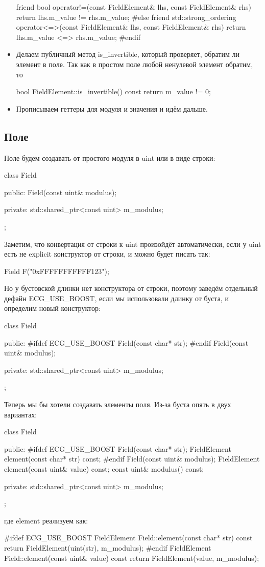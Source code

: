 \begin{itemize}
\begin{cppcode}
friend bool operator!=(const FieldElement& lhs, const FieldElement& rhs) {
    return lhs.m_value != rhs.m_value;
}
#else
friend std::strong_ordering operator<=>(const FieldElement& lhs, const FieldElement& rhs) {
    return lhs.m_value <=> rhs.m_value;
}
#endif
  \end{cppcode}

  \item Делаем публичный метод is\_invertible, который проверяет, обратим ли элемент в поле. Так как в простом поле любой ненулевой элемент обратим, то
  \begin{cppcode}
bool FieldElement::is_invertible() const {
    return m_value != 0;
}
  \end{cppcode}

  \item Прописываем геттеры для модуля и значения и идём дальше.
\end{itemize}
\subsection{Поле}
  Поле будем создавать от простого модуля в uint или в виде строки:
  \begin{cppcode}
class Field {
public:
    Field(const uint& modulus);

private:
    std::shared_ptr<const uint> m_modulus;
};
  \end{cppcode}
  Заметим, что конвертация от строки к uint произойдёт автоматически, если у uint есть не explicit конструктор от строки, и можно будет писать так:
  \begin{cppcode}
Field F("0xFFFFFFFFFFF123");
  \end{cppcode}
  Но у бустовской длинки нет конструктора от строки, поэтому заведём отдельный дефайн ECG\_USE\_BOOST, если мы использовали длинку от буста, и определим новый конструктор:
  \begin{cppcode}
class Field {
public:
#ifdef ECG_USE_BOOST
    Field(const char* str);
#endif
    Field(const uint& modulus);

private:
    std::shared_ptr<const uint> m_modulus;
};
\end{cppcode}
  Теперь мы бы хотели создавать элементы поля. Из-за буста опять в двух вариантах:
  \begin{cppcode}
class Field {
public:
#ifdef ECG_USE_BOOST
    Field(const char* str);
    FieldElement element(const char* str) const;
#endif
    Field(const uint& modulus);
    FieldElement element(const uint& value) const;
    const uint& modulus() const;

private:
    std::shared_ptr<const uint> m_modulus;
};
  \end{cppcode}
  где element реализуем как:
  \begin{cppcode}
#ifdef ECG_USE_BOOST
FieldElement Field::element(const char* str) const {
    return FieldElement(uint(str), m_modulus);
}
#endif
FieldElement Field::element(const uint& value) const {
    return FieldElement(value, m_modulus);
}
  \end{cppcode}

